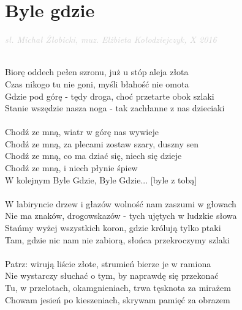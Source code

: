 \documentclass[a5paper, 10pt]{book}
\begin{document}
\section{Byle gdzie}\textcolor{lightgray}{\textit{sł. Michał Żłobicki, muz. Elżbieta Kołodziejczyk, X 2016}}\\
\begin{minipage}[t]{0.8\textwidth}
  ~\\
  Biorę oddech pełen szronu, już u stóp aleja złota		\\
  Czas nikogo tu nie goni, myśli błahość nie omota		\\
  Gdzie pod górę - tędy droga, choć przetarte obok szlaki\\
  Stanie wszędzie nasza noga - tak zachłanne z nas dzieciaki\\
  \\
  \hspace*{5mm}Chodź ze mną, wiatr w górę nas wywieje			\\
  \hspace*{5mm}Chodź ze mną, za plecami zostaw szary, duszny sen\\
  \hspace*{5mm}Chodź ze mną, co ma dziać się, niech się dzieje		\\
  \hspace*{5mm}Chodź ze mną, i niech płynie śpiew			\\
  \hspace*{5mm}W kolejnym Byle Gdzie, Byle Gdzie... [byle z tobą]\\
  \\
  W labiryncie drzew i głazów wolność nam zaszumi w głowach\\
  Nie ma znaków, drogowskazów - tych ujętych w ludzkie słowa\\
  Stańmy wyżej wszystkich koron, gdzie królują tylko ptaki\\
  Tam, gdzie nic nam nie zabiorą, słońca przekroczymy szlaki\\
  \\
  Patrz: wirują liście złote, strumień bierze je w ramiona\\
  Nie wystarczy słuchać o tym, by naprawdę się przekonać\\
  Tu, w przelotach, okamgnieniach, trwa tęsknota za mirażem\\
  Chowam jesień po kieszeniach, skrywam pamięć za obrazem\\
\end{minipage}
\end{document}
